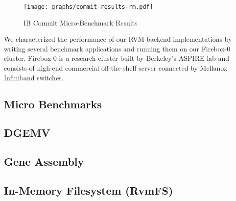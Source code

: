 
\begin{figure}[t!]
    \caption{IB Commit Micro-Benchmark Results}
    \texttt{[image: graphs/commit-results-rm.pdf]}
    \label{fig:ib-commit-ubm}
\end{figure}


We characterized the performance of our RVM backend implementations by writing
several benchmark applications and running them on our Firebox-0 cluster.
Firebox-0 is a research cluster built by Berkeley's ASPIRE lab and consists
of high-end commercial off-the-shelf server connected by Mellanox Infiniband
switches.


\subsection{Micro Benchmarks}



\subsection{DGEMV}



\subsection{Gene Assembly}



\subsection{In-Memory Filesystem (RvmFS)}




